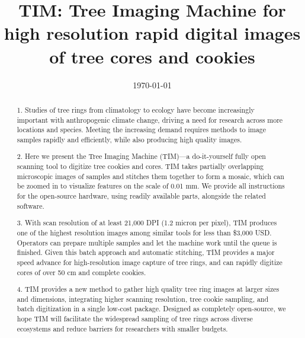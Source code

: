 \documentclass[a4paper,12pt]{article}
\title{TIM: Tree Imaging Machine for high resolution rapid digital images of tree cores and cookies}
\date{\today}
\begin{document}
\linenumbers
\doublespacing
\maketitle

\begin{abstract}  

1.  Studies of tree rings from climatology to ecology have become increasingly important with anthropogenic climate change, driving a need for research across more locations and species. Meeting the increasing demand requires methods to image samples rapidly and efficiently, while also producing high quality images. %

2.  Here we present the Tree Imaging Machine (TIM)---a do-it-yourself fully open scanning tool to digitize tree cookies and cores. TIM takes partially overlapping microscopic images of samples and stitches them together to form a mosaic, which can be zoomed in to visualize features on the scale of 0.01 mm. 
We provide all instructions for the open-source hardware, using readily available parts, alongside the related software. %

3. With scan resolution of at least 21,000 DPI (1.2 micron per pixel), TIM produces one of the highest resolution images among similar tools for less than \$3,000 USD. Operators can prepare multiple samples and let the machine work until the queue is finished. Given this batch approach and automatic stitching, TIM provides a major speed advance for high-resolution image capture of tree rings, and can rapidly digitize cores of over 50 cm and complete cookies. %

4. TIM provides a new method to gather high quality tree ring images at larger sizes and dimensions, integrating higher scanning resolution, tree cookie sampling, and batch digitization in a single low-cost package. 
Designed as completely open-source, we hope TIM will facilitate the widespread sampling of tree rings across diverse ecosystems and reduce barriers for researchers with smaller budgets. 

\end{abstract}
\end{document}
